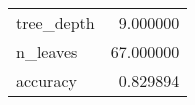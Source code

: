 \begin{tabular}{lr}
\toprule
 &  \\
\midrule
tree\_depth & 9.000000 \\
n\_leaves & 67.000000 \\
accuracy & 0.829894 \\
\bottomrule
\end{tabular}